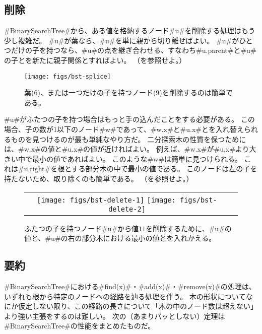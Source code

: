 \subsection{削除}

#BinarySearchTree#から、ある値を格納するノード#u#を削除する処理はもう少し複雑だ。
#u#が葉なら、#u#を単に親から切り離せばよい。
#u#がひとつだけの子を持つなら、#u#の点を継ぎ合わせる、すなわち#u.parent#と#u#の子とを新たに親子関係とすればよい。
（を参照せよ。）

\begin{figure}
  \begin{center}
    \texttt{[image: figs/bst-splice]}
  \end{center}
  \caption{葉($6$)、または一つだけの子を持つノード($9$)を削除するのは簡単である。}
\end{figure}

#u#がふたつの子を持つ場合はもっと手の込んだことをする必要がある。
この場合、子の数が1以下のノード#w#であって、#w.x#と#u.x#とを入れ替えられるものを見つけるのが最も単純なやり方だ。
二分探索木の性質を保つためには、#w.x#の値と#u.x#の値が近ければよい。
例えば、#w.x#が#u.x#より大きい中で最小の値であればよい。
このような#w#は簡単に見つけられる。
これは#u.right#を根とする部分木の中で最小の値である。
このノードは左の子を持たないため、取り除くのも簡単である。
（を参照せよ。）

\begin{figure}
  \begin{center}
    \begin{tabular}{cc}
    \texttt{[image: figs/bst-delete-1]}
    \texttt{[image: figs/bst-delete-2]}
    \end{tabular}
  \end{center}
  \caption{ふたつの子を持つノード#u#から値$11$を削除するために、#u#の値と、#u#の右の部分木における最小の値とを入れかえる。}
\end{figure}

\subsection{要約}

#BinarySearchTree#における#find(x)#・#add(x)#・#remove(x)#の処理は、いずれも根から特定のノードへの経路を辿る処理を伴う。
木の形状についてなにか仮定しない限り、この経路の長さについて「木の中のノード数は超えない」より強い主張をするのは難しい。
次の（あまりパッとしない）定理は#BinarySearchTree#の性能をまとめたものだ。


